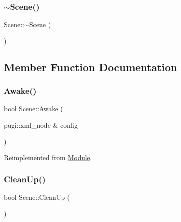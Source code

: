\mbox{\label{class_scene_a3b8cec2e32546713915f8c6303c951f1}} 
\subsubsection{\texorpdfstring{$\sim$Scene()}{~Scene()}}
{\footnotesize\ttfamily Scene\+::$\sim$\+Scene (\begin{DoxyParamCaption}{ }\end{DoxyParamCaption})\hspace{0.3cm}{\ttfamily [virtual]}}



\subsection{Member Function Documentation}
\mbox{\label{class_scene_a03ed816e27ef7dced05082d214f554f1}} 
\subsubsection{\texorpdfstring{Awake()}{Awake()}}
{\footnotesize\ttfamily bool Scene\+::\+Awake (\begin{DoxyParamCaption}\item[{pugi\+::xml\+\_\+node \&}]{config }\end{DoxyParamCaption})\hspace{0.3cm}{\ttfamily [virtual]}}



Reimplemented from \mbox{\hyperlink{class_module_a4a283650cf8a73aa0b5599106bc2ba6c}{Module}}.

\mbox{\label{class_scene_aac06490e9440c38b6970740a099ad14a}} 
\subsubsection{\texorpdfstring{CleanUp()}{CleanUp()}}
{\footnotesize\ttfamily bool Scene\+::\+Clean\+Up (\begin{DoxyParamCaption}{ }\end{DoxyParamCaption})\hspace{0.3cm}{\ttfamily [virtual]}}



